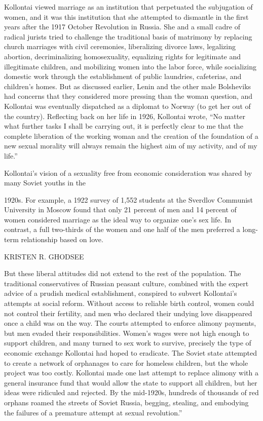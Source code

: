 Kollontai viewed marriage as an institution that perpetuated the subjugation of women, and it was this institution that she attempted to dismantle in the first years after the 1917 October Revolution in Russia. She and a small cadre of radical jurists tried to challenge the traditional basis of matrimony by replacing church marriages with civil ceremonies, liberalizing divorce laws, legalizing abortion, decriminalizing homosexuality, equalizing rights for legitimate and illegitimate children, and mobilizing women into the labor force, while socializing domestic work through the establishment of public laundries, cafeterias, and children’s homes. But as discussed earlier, Lenin and the other male Bolsheviks had concerns that they considered more pressing than the woman question, and Kollontai was eventually dispatched as a diplomat to Norway (to get her out of the country). Reflecting back on her life in 1926, Kollontai wrote, “No matter what further tasks I shall be carrying out, it is perfectly clear to me that the complete liberation of the working woman and the creation of the foundation of a new sexual morality will always remain the highest aim of my activity, and of my life.”
 \par 
Kollontai’s vision of a sexuality free from economic consideration was shared by many Soviet youths in the
 \par 
1920s. For example, a 1922 survey of 1,552 students at the Sverdlov Communist University in Moscow found that only {\color{blue}21} percent of men and {\color{blue}14} percent of women considered marriage as the ideal way to organize one’s sex life. In contrast, a full two-thirds of the women and one half of the men preferred a long-term relationship based on love.
 \par 
KRISTEN R. GHODSEE
 \par 
But these liberal attitudes did not extend to the rest of the population. The traditional conservatives of Russian peasant culture, combined with the expert advice of a prudish medical establishment, conspired to subvert Kollontai’s attempts at social reform. Without access to reliable birth control, women could not control their fertility, and men who declared their undying love disappeared once a child was on the way. The courts attempted to enforce alimony payments, but men evaded their responsibilities. Women’s wages were not high enough to support children, and many turned to sex work to survive, precisely the type of economic exchange Kollontai had hoped to eradicate. The Soviet state attempted to create a network of orphanages to care for homeless children, but the whole project was too costly. Kollontai made one last attempt to replace alimony with a general insurance fund that would allow the state to support all children, but her ideas were ridiculed and rejected. By the mid-1920s, hundreds of thousands of red orphans roamed the streets of Soviet Russia, begging, stealing, and embodying the failures of a premature attempt at sexual revolution.”
